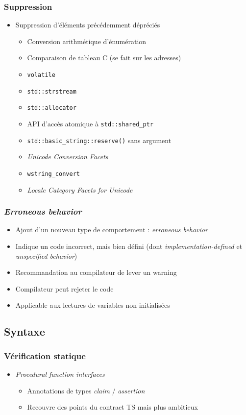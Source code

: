 \documentclass[C++.tex]{subfiles}
\begin{document}
\begin{frame}[fragile]
	\frametitle{Suppression}
	\begin{itemize}
		\item Suppression d'éléments précédemment dépréciés
		\begin{itemize}
			\item Conversion arithmétique d'énumération
			\item Comparaison de tableau C (se fait sur les adresses)
			\item \lstinline|volatile|
			\item \lstinline|std::strstream|
			\item \lstinline|std::allocator|
			\item API d'accès atomique à \lstinline|std::shared_ptr|
			\item \lstinline|std::basic_string::reserve()| sans argument
			\item \textit{Unicode Conversion Facets}
			\item \lstinline|wstring_convert|
			\item \textit{Locale Category Facets for Unicode}
		\end{itemize}
	\end{itemize}
\end{frame}

\begin{frame}[fragile]
	\frametitle{\textit{Erroneous behavior}}
	\begin{itemize}
		\item Ajout d'un nouveau type de comportement : \textit{erroneous behavior}
		\item Indique un code incorrect, mais bien défini (dont \textit{implementation-defined} et \textit{unspecified behavior})
		\item Recommandation au compilateur de lever un warning
		\item Compilateur peut rejeter le code
		\item Applicable aux lectures de variables non initialisées
	\end{itemize}
\end{frame}

\subsection*{Syntaxe}
\begin{frame}[fragile]
	\frametitle{Vérification statique}
	\begin{itemize}
		\item \textit{Procedural function interfaces} 
		\begin{itemize}
			\item Annotations de types \textit{claim} / \textit{assertion}
			\item Recouvre des points du contract TS mais plus ambitieux
		\end{itemize}
	\end{itemize}
\end{frame}
\end{document}
